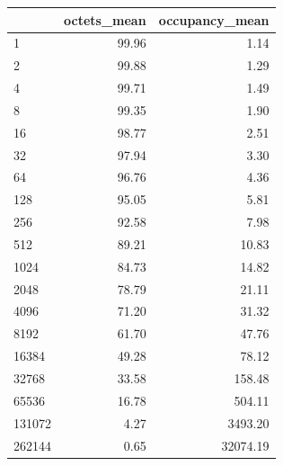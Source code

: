 \begin{tabular}{lrr}
\toprule
 & octets_mean & occupancy_mean \\
\midrule
1 & 99.96 & 1.14 \\
2 & 99.88 & 1.29 \\
4 & 99.71 & 1.49 \\
8 & 99.35 & 1.90 \\
16 & 98.77 & 2.51 \\
32 & 97.94 & 3.30 \\
64 & 96.76 & 4.36 \\
128 & 95.05 & 5.81 \\
256 & 92.58 & 7.98 \\
512 & 89.21 & 10.83 \\
1024 & 84.73 & 14.82 \\
2048 & 78.79 & 21.11 \\
4096 & 71.20 & 31.32 \\
8192 & 61.70 & 47.76 \\
16384 & 49.28 & 78.12 \\
32768 & 33.58 & 158.48 \\
65536 & 16.78 & 504.11 \\
131072 & 4.27 & 3493.20 \\
262144 & 0.65 & 32074.19 \\
\bottomrule
\end{tabular}
